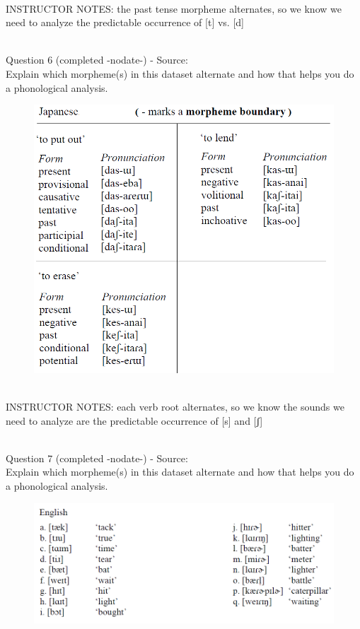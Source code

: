 \documentclass[12pt]{article}
\begin{document}
~\\
INSTRUCTOR NOTES: the past tense morpheme alternates, so we know we need to analyze the predictable occurrence of [t] vs. [d]


~\\

{\large Question 6} (completed -nodate-) - Source: \\

Explain which morpheme(s) in this dataset alternate and how that helps you do a phonological analysis.\\

\begin{figure}[H]
\includegraphics{../images/japanese_verbs.png}
\end{figure}

~\\
INSTRUCTOR NOTES: each verb root alternates, so we know the sounds we need to analyze are the predictable occurrence of [s] and [ʃ]


~\\

{\large Question 7} (completed -nodate-) - Source: \\

Explain which morpheme(s) in this dataset alternate and how that helps you do a phonological analysis.\\

\begin{figure}[H]
\includegraphics{../images/english_t_flap.png}
\end{figure}
\end{document}
